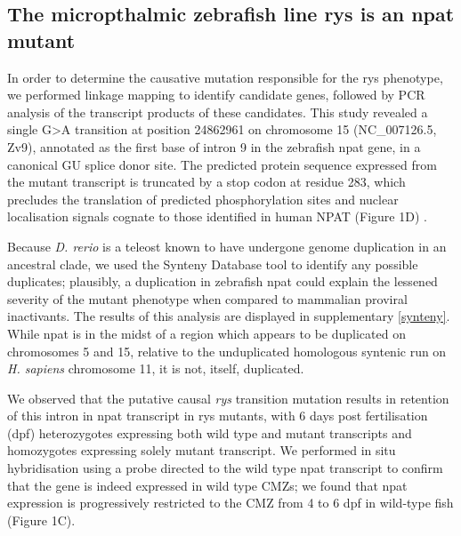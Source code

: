 \subsection{The micropthalmic zebrafish line rys is an npat mutant}

In order to determine the causative mutation responsible for the rys phenotype, we performed linkage mapping to identify candidate genes, followed by PCR analysis of the transcript products of these candidates. This study revealed a single G\textgreater{}A transition at position 24862961 on chromosome 15 (NC\_007126.5, Zv9), annotated as the first base of intron 9 in the zebrafish npat gene, in a canonical GU splice donor site. The predicted protein sequence expressed from the mutant transcript is truncated by a stop codon at residue 283, which precludes the translation of predicted phosphorylation sites and nuclear localisation signals cognate to those identified in human NPAT (Figure 1D) \cite{Ma2000,Sagara2002}.

Because \textit{D. rerio} is a teleost known to have undergone genome duplication in an ancestral clade, we used the Synteny Database tool to identify any possible duplicates; plausibly, a duplication in zebrafish npat could explain the lessened severity of the mutant phenotype when compared to mammalian proviral inactivants. The results of this analysis are displayed in supplementary \autoref{synteny}. While npat is in the midst of a region which appears to be duplicated on chromosomes 5 and 15, relative to the unduplicated homologous syntenic run on \textit{H. sapiens} chromosome 11, it is not, itself, duplicated. 

We observed that the putative causal \textit{rys} transition mutation results in retention of this intron in npat transcript in rys mutants, with 6 days post fertilisation (dpf) heterozygotes expressing both wild type and mutant transcripts and homozygotes expressing solely mutant transcript. We performed in situ hybridisation using a probe directed to the wild type npat transcript to confirm that the gene is indeed expressed in wild type CMZs; we found that npat expression is progressively restricted to the CMZ from 4 to 6 dpf in wild-type fish (Figure 1C).

